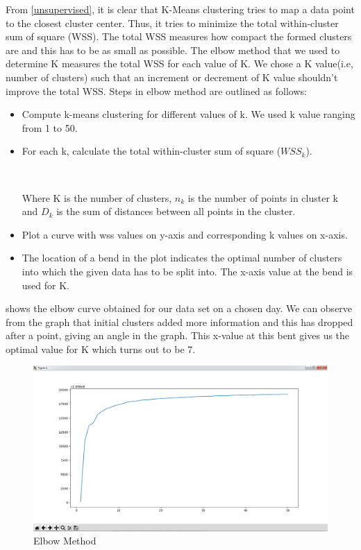  From \ref{unsupervised}, it is clear that K-Means clustering tries to map a data point to the closest cluster center. Thus, it tries to minimize the total within-cluster sum of square (WSS). The total WSS measures how compact the formed clusters are and this has to be as small as possible. The elbow method that we used to determine K measures the total WSS for each value of K. We chose a K value(i.e, number of clusters) such that an increment or decrement of K value shouldn't improve the total WSS. 
 Steps in elbow method are outlined as follows:
 \begin{itemize}
 	\item Compute k-means clustering for different values of k. We used k value ranging from 1 to 50.
 	
 	\item For each k, calculate the total within-cluster sum of square ($WSS_k$).
 	\begin{center}
 	 		 \\
 	 	
 	 	
 	\end{center}  
    Where K is the number of clusters, $n_k$ is the number of points in cluster k and $D_k$ is the sum of distances between all points in the cluster.
 	\item Plot a curve with wss values on y-axis and corresponding k values on x-axis. 	
 	\item The location of a bend in the plot indicates the optimal number of clusters into which the given data has to be split into. The x-axis value at the bend is used for K.
 \end{itemize}

   shows the elbow curve obtained for our data set on a chosen day. We can observe from the graph that initial clusters added more information and this has dropped after a point, giving an angle in the graph. This x-value at this bent gives us the optimal value for K which turns out to be 7.
 	

\begin{figure}[b]
	\centerline{\includegraphics[scale = 0.4]{elbow.png}}
	\caption{Elbow Method}%
\end{figure}

